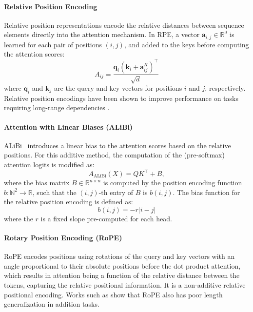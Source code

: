 \paragraph{Relative Position Encoding}\label{subsec:relative_pos_enc}
Relative position representations \parencite{shaw_self-attention_2018} encode the relative distances between sequence elements directly into the attention mechanism. In RPE, a vector $\mathbf{a}_{i, j} \in \mathbb{R}^d$ is learned for each pair of positions $(i, j)$, and added to the keys before computing the attention scores:
\begin{equation*}
    A_{ij} = \frac{\mathbf{q}_i (\mathbf{k}_i + \mathbf{a}_{ij}^K)^\top}{\sqrt{d}}
\end{equation*}
where $\mathbf{q}_i$ and $\mathbf{k}_j$ are the query and key vectors for positions $i$ and $j$, respectively. Relative position encodings have been shown to improve performance on tasks requiring long-range dependencies \parencite{shaw_self-attention_2018}.

\paragraph{Attention with Linear Biases (ALiBi)}\label{subsec:alibi}
ALiBi~\parencite{press_train_2021} introduces a linear bias to the attention scores based on the relative positions. For this additive method, the computation of the (pre-softmax) attention logits is modified as:
\begin{equation*}
    A_{\text{ALiBi}}(X) = Q K^\top + B,
\end{equation*}
where the bias matrix $B \in \mathbb{R}^{n \times n}$ is computed by the position encoding function $b : \mathbb{N}^2 \to \mathbb{R}$, such that the $(i,j)$-th entry of $B$ is $b(i,j)$. The bias function for the relative position encoding is defined as:
\begin{equation*}
    b(i,j) = -r|i - j|
\end{equation*}
where the $r$ is a fixed slope pre-computed for each head.

\paragraph{Rotary Position Encoding (RoPE)}\label{subsec:rope}
RoPE \cite{su_roformer_2024} encodes positions using rotations of the query and key vectors with an angle proportional to their absolute positions before the dot product attention, which results in attention being a function of the relative distance between the tokens, capturing the relative positional information. It is a non-additive relative positional encoding. Works such as \cite{press_train_2021,kazemnejad_impact_2023} show that RoPE also has poor length generalization in addition tasks.

